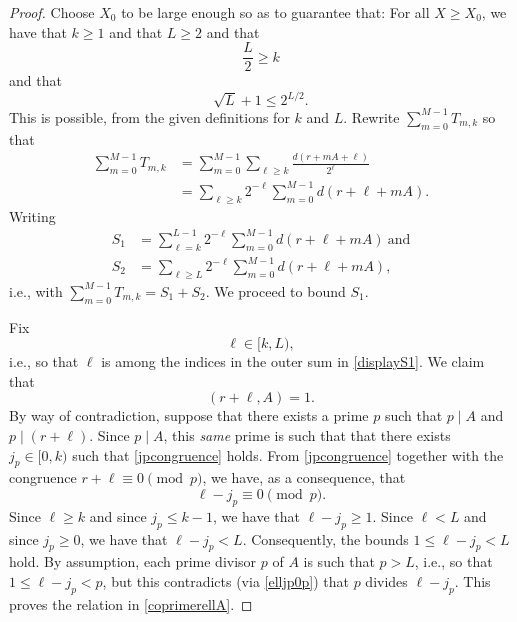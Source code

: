 \documentclass[10pt,a4paper]{amsart}
\begin{document}
\begin{proof}
 Choose $X_0$ to be large enough so as to guarantee that: For all $X \geq X_0$, we have that $k \geq 1$ and that $L \geq 2$ and that 
\begin{equation}\label{Lhalfk} 
 \frac{L}{2} \geq k 
\end{equation} 
and that 
\begin{equation}\label{sqrtLpower} 
 \sqrt{L} + 1 \leq 2^{L/2}.
\end{equation}
 This is possible, from the given definitions for $k$ and $L$. Rewrite $\sum_{m=0}^{M-1} T_{m, k}$ so that 
\begin{align*}
 \sum_{m=0}^{M-1} T_{m, k}
 & = \sum_{m=0}^{M-1} \sum_{\ell \geq k} \frac{d(r + m A + \ell)}{2^{\ell}} \\
 & = \sum_{\ell \geq k} 2^{-\ell} \sum_{m=0}^{M-1} d(r + \ell + m A). 
\end{align*}
 Writing 
\begin{align}
 S_1 & = \sum_{\ell = k}^{L-1} 2^{-\ell} \sum_{m=0}^{M-1} d(r + \ell + m A) \ \text{and} \label{displayS1} \\ 
 S_{2} & = \sum_{\ell \geq L} 2^{-\ell} \sum_{m=0}^{M-1} d(r + \ell + m A), \label{displayS2}
\end{align}
 i.e., with $ \sum_{m=0}^{M-1} T_{m, k} = S_{1} + S_{2}$. We proceed to bound $S_{1}$. 

 Fix 
\begin{equation}\label{ellkL}
 \ell \in [k, L), 
\end{equation}
 i.e., so that $\ell$ is among the indices in the outer sum in \eqref{displayS1}. We claim that 
\begin{equation}\label{coprimerellA}
 (r + \ell, A) = 1. 
\end{equation} 
 By way of contradiction, suppose that there exists a prime $p$ such that $p \mid A$ and $p \mid (r + \ell)$. Since $p \mid A$, this 
 \emph{same} prime is such that that there exists $j_p \in [0, k)$ such that \eqref{jpcongruence} holds. From \eqref{jpcongruence} 
 together with the congruence $ r + \ell \equiv 0 \pmod p$, we have, as a consequence, that 
\begin{equation}\label{elljp0p} 
 \ell - j_p \equiv 0 \pmod p. 
\end{equation}
 Since $\ell \geq k$ and since $j_p \leq k -1$, we have that $\ell - j_p \geq 1$. Since $\ell < L$ and since $j_p \geq 0$, we have that 
 $\ell - j_p < L$. Consequently, 
 the bounds $1 \leq \ell - j_p < L$ hold. By assumption, each prime divisor $p$ of $A$ is such that $p 
 > L$, i.e., so that $1 \leq \ell - j_p < p$, but this contradicts (via \eqref{elljp0p})
 that $p$ divides $\ell - j_p$. 
 This proves the relation in \eqref{coprimerellA}. 


\end{proof}
\end{document}
